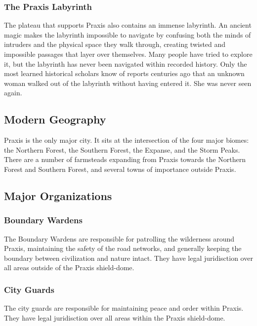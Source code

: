         \subsubsection{The Praxis Labyrinth}
            The plateau that supports Praxis also contains an immense labyrinth.
            An ancient magic makes the labyrinth impossible to navigate by confusing both the minds of intruders and the physical space they walk through, creating twisted and impossible passages that layer over themselves.
            Many people have tried to explore it, but the labyrinth has never been navigated within recorded history.
            Only the most learned historical scholars know of reports centuries ago that an unknown woman walked out of the labyrinth without having entered it.
            She was never seen again.

    \subsection{Modern Geography}
        Praxis is the only major city.
        It sits at the intersection of the four major biomes: the Northern Forest, the Southern Forest, the Expanse, and the Storm Peaks.
        There are a number of farmsteads expanding from Praxis towards the Northern Forest and Southern Forest, and several towns of importance outside Praxis.

    \subsection{Major Organizations}

        \subsubsection{Boundary Wardens}
            The Boundary Wardens are responsible for patrolling the wilderness around Praxis, maintaining the safety of the road networks, and generally keeping the boundary between civilization and nature intact.
            They have legal juridisction over all areas outside of the Praxis shield-dome.

        \subsubsection{City Guards}
            The city guards are responsible for maintaining peace and order within Praxis.
            They have legal juridisction over all areas within the Praxis shield-dome.

